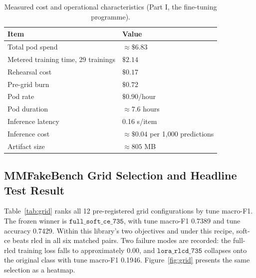 \documentclass{article} %
\begin{document}
\begin{table}[t]
\centering
\small
\caption{Measured cost and operational characteristics (Part I, the fine-tuning programme).}
\label{tab:cost}
\begin{tabular}{ll}
\toprule
Item & Value \\
\midrule
Total pod spend & \(\approx \$6.83\) \\
Metered training time, 29 trainings & \(\$2.14\) \\
Rehearsal cost & \(\$0.17\) \\
Pre-grid burn & \(\$0.72\) \\
Pod rate & \(\$0.90\)/hour \\
Pod duration & \(\approx 7.6\) hours \\
Inference latency & 0.16 s/item \\
Inference cost & \(\approx \$0.04\) per 1,000 predictions \\
Artifact size & \(\approx 805\) MB \\
\bottomrule
\end{tabular}
\end{table}

\subsection{MMFakeBench Grid Selection and Headline Test Result}
Table~\ref{tab:grid} ranks all 12 pre-registered grid configurations by tune macro-F1. The frozen winner is \( \texttt{full\_soft\_ce\_735} \), with tune macro-F1 0.7389 and tune accuracy 0.7429. Within this library's two objectives and under this recipe, soft-ce beats rlcd in all six matched pairs. Two failure modes are recorded: the full-rlcd training loss falls to approximately 0.00, and \( \texttt{lora\_rlcd\_735} \) collapses onto the original class with tune macro-F1 0.1946. Figure~\ref{fig:grid} presents the same selection as a heatmap.
\end{document}
